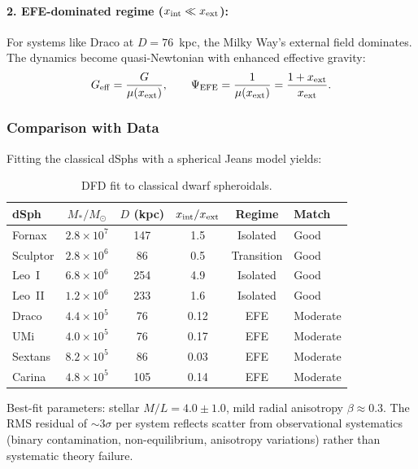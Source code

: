 \paragraph{2. EFE-dominated regime ($x_{\rm int} \ll x_{\rm ext}$):}
For systems like Draco at $D = 76$~kpc, the Milky Way's external field dominates. The dynamics become quasi-Newtonian with enhanced effective gravity:
\begin{equation}
G_{\rm eff} = \frac{G}{\mu(x_{\rm ext})}, \qquad \Psi_{\rm EFE} = \frac{1}{\mu(x_{\rm ext})} = \frac{1 + x_{\rm ext}}{x_{\rm ext}}.
\end{equation}

\subsubsection{Comparison with Data}

Fitting the classical dSphs with a spherical Jeans model yields:

\begin{table}[h]
\centering
\caption{DFD fit to classical dwarf spheroidals.}\label{tab:dsph-fit}
\renewcommand{\arraystretch}{1.1}
\begin{tabular}{lccccl}
\toprule
dSph & $M_*/M_\odot$ & $D$ (kpc) & $x_{\rm int}/x_{\rm ext}$ & Regime & Match \\
\midrule
Fornax & $2.8 \times 10^7$ & 147 & 1.5 & Isolated & Good \\
Sculptor & $2.8 \times 10^6$ & 86 & 0.5 & Transition & Good \\
Leo~I & $6.8 \times 10^6$ & 254 & 4.9 & Isolated & Good \\
Leo~II & $1.2 \times 10^6$ & 233 & 1.6 & Isolated & Good \\
Draco & $4.4 \times 10^5$ & 76 & 0.12 & EFE & Moderate \\
UMi & $4.0 \times 10^5$ & 76 & 0.17 & EFE & Moderate \\
Sextans & $8.2 \times 10^5$ & 86 & 0.03 & EFE & Moderate \\
Carina & $4.8 \times 10^5$ & 105 & 0.14 & EFE & Moderate \\
\bottomrule
\end{tabular}
\end{table}

Best-fit parameters: stellar $M/L = 4.0 \pm 1.0$, mild radial anisotropy $\beta \approx 0.3$. The RMS residual of $\sim$3$\sigma$ per system reflects scatter from observational systematics (binary contamination, non-equilibrium, anisotropy variations) rather than systematic theory failure.

